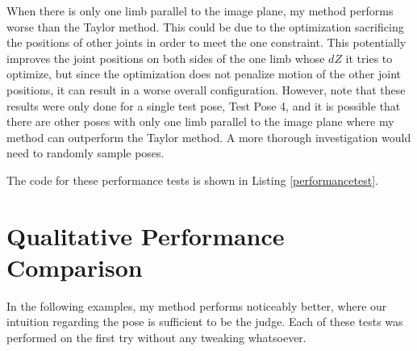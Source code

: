 \documentclass[final]{article}
\begin{document}
\begin{spacing}{1.1}
When there is only one limb parallel to the image plane, my method performs worse than the Taylor method. This could be due to the optimization sacrificing the positions of other joints in order to meet the one constraint. This potentially improves the joint positions on both sides of the one limb whose $dZ$ it tries to optimize, but since the optimization does not penalize motion of the other joint positions, it can result in a worse overall configuration. However, note that these results were only done for a single test pose, Test Pose 4, and it is possible that there are other poses with only one limb parallel to the image plane where my method can outperform the Taylor method. A more thorough investigation would need to randomly sample poses.

The code for these performance tests is shown in Listing \ref{performancetest}.

\section{Qualitative Performance Comparison}

In the following examples, my method performs noticeably better, where our intuition regarding the pose is sufficient to be the judge. Each of these tests was performed on the first try without any tweaking whatsoever.


\end{spacing}
\end{document}
